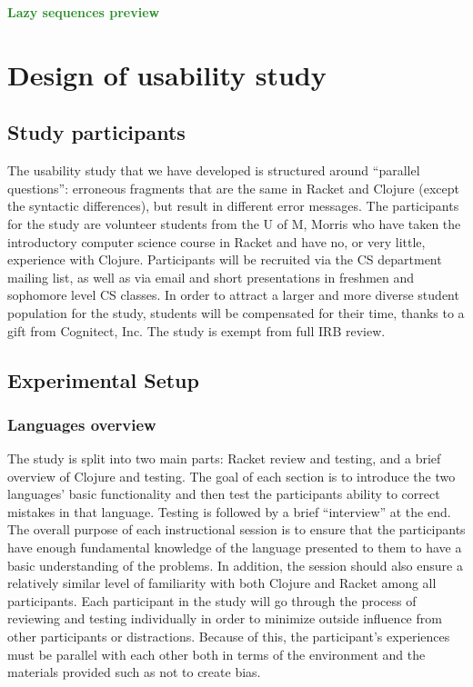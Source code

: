 \documentclass[submission,copyright,creativecommons]{eptcs}
\newcommand{\allcomments}[1]{{#1}}
\newcommand{\emcomment}[1]{{\bf \textcolor{ForestGreen}{\allcomments{{#1}}}}}
\newcommand{\thcomment}[1]{{\bf \textcolor{blue}{\allcomments{{#1}}}}}
\begin{document}
\emcomment{Lazy sequences preview}

\section{Design of usability study}\label{sec:study}
	
	\subsection{Study participants}\label{sec:obj}
The usability study that we have developed is structured around ``parallel questions'': erroneous fragments that are the same in 
Racket and Clojure (except the syntactic differences), but result in different error messages.  
The participants for the study are volunteer students from the U of M, Morris who have taken the introductory computer science course in Racket and have no, or very little, experience with Clojure.
Participants will be recruited via the CS department mailing list, as well as via email and short presentations in freshmen and sophomore level CS classes. 
In order to attract a larger and more diverse student population for the study, students will be compensated for their time, thanks to a gift from Cognitect, Inc. 
The study is exempt from full IRB review. 

	\subsection{Experimental Setup}\label{sec:setup}
	
	   


\subsubsection{Languages overview}\label{subsec:overview}

The study is split into two main parts: Racket review and testing, and a brief overview of Clojure and testing.
The goal of each section is to introduce the two languages' basic functionality and then test the participants ability to correct mistakes in that language.
Testing is followed by a brief ``interview'' at the end. 
The overall purpose of each instructional session is to ensure that the participants have enough fundamental knowledge of the language presented to them to have a basic understanding of the problems. 
In addition, the session should also ensure a relatively similar level of familiarity with both Clojure and Racket among all participants. 
Each participant in the study will go through the process of reviewing and testing individually in order to minimize outside influence from other participants or distractions. 
Because of this, the participant's experiences must be parallel with each other both in terms of the environment and the materials provided such as not to create bias.
\end{document}
